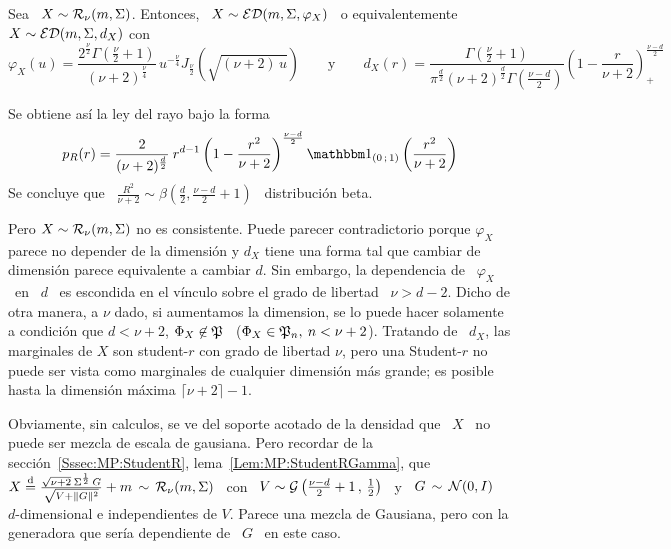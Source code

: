 \begin{ejemplo}
%
  Sea \ $X \sim \mathcal{R}_\nu(m,\Sigma)$.  Entonces, \ $X \sim \mathcal{ED}(m,\Sigma,\varphi_X)$
  \ o equivalentemente \ $X \sim \mathcal{ED}(m,\Sigma,d_X)$ con
  \[
  \varphi_X(u)   =   \frac{2^{\frac{\nu}{2}}   \Gamma\left(   \frac{\nu}{2}   +1
    \right)}{(\nu+2)^{\frac{\nu}{4}}}            \,           u^{-\frac{\nu}{4}}
  J_{\frac{\nu}{2}}\left(  \sqrt{(\nu+2) \,  u} \right)  \qquad  \mbox{y} \qquad
  d_X(r)  =  \frac{\Gamma\left(  \frac{\nu}{2}  +  1  \right)}{\pi^{\frac{d}{2}}
    (\nu+2)^{\frac{d}{2}}  \Gamma\left(  \frac{\nu-d}{2}  \right)}  \left(  1  -
    \frac{r}{\nu+2} \right)_+^{\frac{\nu-d}{2}}
  \]
  
  Se obtiene as\'i la ley del rayo bajo la forma
  \[
  p_R(r) = \frac{2}{(\nu+2)^{\frac{d}{2}}} \:  r^{d-1} \left( 1 - \frac{r^2}{\nu+2}
  \right)^{\frac{\nu-d}{2}} \un_{(0 \; 1)}\left( \frac{r^2}{\nu+2} \right)
  \]
  Se  concluye   que  \   $\frac{R^2}{\nu+2}  \sim  \beta\left(   \frac{d}{2}  ,
    \frac{\nu-d}{2}+1 \right)$ \ distribuci\'on beta.

  Pero $X \sim \mathcal{R}_\nu(m,\Sigma)$ no es consistente. Puede parecer contradictorio
  porque  $\varphi_X$ parece no  depender de  la dimensi\'on  y $d_X$  tiene una
  forma tal  que cambiar  de dimensi\'on parece  equivalente a cambiar  $d$. Sin
  embargo, la  dependencia de  \ $\varphi_X$  \ en \  $d$ \  es escondida  en el
  v\'inculo sobre el  grado de libertad \  $\nu > d-2$. Dicho de  otra manera, a
  $\nu$  dado,  si  aumentamos la  dimension,  se  lo  puede hacer  solamente  a
  condici\'on que $d < \nu+2$, \ie $\Phi_X \not\in \mathfrak{P}$ \ ($\Phi_X \in \mathfrak{P}_n, \:
  n < \nu+2$).   Tratando de \ $d_X$, las marginales de  $X$ son student-$r$ con
  grado  de  libertad  $\nu$, pero  una  Student-$r$  no  puede ser  vista  como
  marginales  de  cualquier  dimensi\'on  m\'as  grande;  es  posible  hasta  la
  dimensi\'on m\'axima $\lceil \nu+2 \rceil-1$.

  Obviamente, sin calculos, se ve del soporte acotado de la densidad que \ $X$ \
  no  puede   ser  mezcla   de  escala  de   gausiana.   Pero  recordar   de  la
  secci\'on~\ref{Sssec:MP:StudentR},  lema~\ref{Lem:MP:StudentRGamma}, que  \ $X
  \stackrel{\mathrm{d}}{=} \frac{\sqrt{\nu+2} \: \Sigma^{\frac12} \, G}{\sqrt{V + \|G\|^2}} + m \,
  \sim \, \mathcal{R}_\nu( m , \Sigma )$  \ con \ $V \sim \mathcal{G}\left( \frac{\nu-d}{2}+1 \, ,
    \,  \frac12 \right)$  \  y \  $G \,  \sim  \, \mathcal{N}(0,I)$  \ $d$-dimensional  e
  independientes de $V$.  Parece una mezcla de Gausiana,  pero con la generadora
  que ser\'ia dependiente de \ $G$ \ en este caso.
\end{ejemplo}

